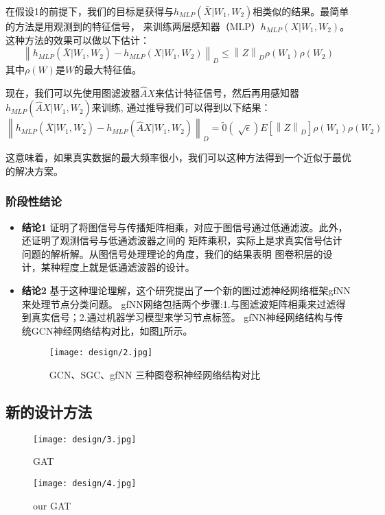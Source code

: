 在假设1的前提下，我们的目标是获得与$ h_{MLP}(\bar{X}|W_1,W_2) $相类似的结果。最简单的方法是用观测到的特征信号，
来训练两层感知器（MLP）$ h_{MLP}(X|W_1,W_2) $。这种方法的效果可以做以下估计：
$$  \left \| h_{MLP}(\bar{X}|W_1,W_2) - h_{MLP}(X|W_1,W_2) \right \|_{D}  \le  \left \| Z \right \|_{D} \rho(W_{1}) \rho(W_{2}) $$
其中$ \rho(W) $是$W$的最大特征值。

现在，我们可以先使用图滤波器$ \hat{A}X $来估计特征信号，然后再用感知器$ h_{MLP}(\hat{A}X|W_1,W_2) $来训练,
通过推导我们可以得到以下结果：
$$  \left \| h_{MLP}(\bar{X}|W_1,W_2) - h_{MLP}(\hat{A}X|W_1,W_2) \right \|_{D}  =  \tilde{0}(\sqrt[]{\epsilon }) E[\left \| Z \right \|_{D}] \rho(W_{1}) \rho(W_{2}) $$

这意味着，如果真实数据的最大频率很小，我们可以这种方法得到一个近似于最优的解决方案。

\subsubsection{阶段性结论}
\begin{itemize}
    \item \textbf{结论1} \quad
    证明了将图信号与传播矩阵相乘，对应于图信号通过低通滤波。此外，还证明了观测信号与低通滤波器之间的
    矩阵乘积，实际上是求真实信号估计问题的解析解。从图信号处理理论的角度，我们的结果表明
    图卷积层的设计，某种程度上就是低通滤波器的设计。
    
    \item \textbf{结论2} \quad
    基于这种理论理解，这个研究提出了一个新的图过滤神经网络框架gfNN来处理节点分类问题。
    gfNN网络包括两个步骤:1.与图滤波矩阵相乘来过滤得到真实信号；2.通过机器学习模型来学习节点标签。
    gfNN神经网络结构与传统GCN神经网络结构对比，如图\ref{3-2}所示。
    \begin{figure}[ht]
        \centering
        \captionsetup{width=10cm}
        \texttt{[image: design/2.jpg]}
        \caption{\label{3-2}GCN、SGC、gfNN 三种图卷积神经网络结构对比}
    \end{figure}
\end{itemize}

\subsection{新的设计方法}
\begin{figure}[htbp]
    \centering
    \begin{minipage}[t]{0.48\textwidth}
    \centering
    \captionsetup{width=5cm}
    \texttt{[image: design/3.jpg]}
    \caption{\label{3-3}GAT}
    \end{minipage}
    \begin{minipage}[t]{0.48\textwidth}
    \centering
    \captionsetup{width=5cm}
    \texttt{[image: design/4.jpg]}
    \caption{\label{3-4}our GAT}
    \end{minipage}
\end{figure}

